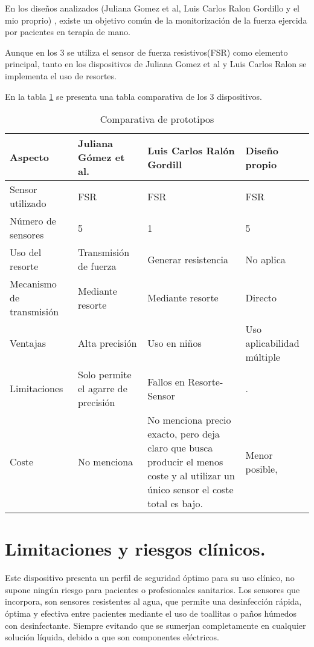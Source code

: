 En los diseños analizados (Juliana Gomez et al, Luis Carlos Ralon Gordillo y el mio proprio) , existe un objetivo común de la monitorización de la fuerza ejercida por pacientes en terapia de mano. 

Aunque en los 3 se utiliza el sensor de fuerza resistivos(FSR) como elemento principal, tanto en los dispositivos de Juliana Gomez et al y Luis Carlos Ralon se implementa el uso de resortes.

En la tabla \ref{tab:comparativa_prototipos} se presenta una tabla comparativa de los 3 dispositivos.
\begin{table}[h]
    \begin{tabular}{|p{2cm}|p{4cm}|p{4cm}|p{4cm}|}
    \hline
    \rowcolor[HTML]{BFBFBF} 
    \textbf{Aspecto} & \textbf{Juliana Gómez et al.} & \textbf{Luis Carlos Ralón Gordill}& \textbf{Diseño propio} \\ \hline
    Sensor utilizado & FSR & FSR & FSR \\ \hline
    Número de sensores & 5 & 1 & 5 \\ \hline
    Uso del resorte & Transmisión de fuerza & Generar resistencia & No aplica \\ \hline
    Mecanismo de transmisión & Mediante resorte & Mediante resorte& Directo \\ \hline
    Ventajas & Alta precisión & Uso en niños & Uso aplicabilidad múltiple\\ \hline
    Limitaciones & Solo permite el agarre de precisión & Fallos en Resorte-Sensor & . \\ \hline
    Coste  & No menciona & No menciona precio exacto, pero deja claro que busca producir el menos coste y al utilizar un único sensor el coste total es bajo. & Menor posible,  \\ \hline
    \end{tabular}
    \caption{Comparativa de prototipos}
    \label{tab:comparativa_prototipos}
\end{table}

\section{Limitaciones y riesgos clínicos.}
Este dispositivo presenta un perfil de seguridad óptimo para su uso clínico, no supone ningún riesgo para pacientes o profesionales sanitarios. Los sensores que incorpora, son sensores resistentes al agua, que permite una desinfección rápida, óptima y efectiva entre pacientes mediante el uso de toallitas o paños húmedos con desinfectante. Siempre evitando que se sumerjan completamente en cualquier solución líquida, debido a que son componentes eléctricos.

